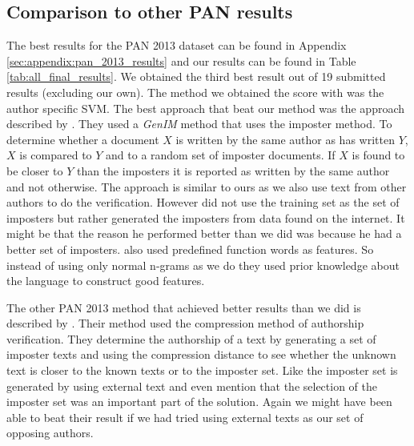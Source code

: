 \subsection{Comparison to other PAN results}
The best results for the PAN 2013 dataset can be found in Appendix
\ref{sec:appendix:pan_2013_results} and our results can be found in Table
\ref{tab:all_final_results}. We obtained the third best
result out of 19 submitted results (excluding our own). The method we obtained
the score with was the author specific SVM. The best approach that beat
our method was the approach described by \cite{seidman:2013}. They used a
\textit{GenIM} method that uses the imposter method. To determine whether a
document $X$ is written by the same author as has written $Y$, $X$ is compared
to $Y$ and to a random set of imposter documents. If $X$ is found to be closer
to $Y$ than the imposters it is reported as written by the same author and
not otherwise. The approach is similar to ours as we also use text from other
authors to do the verification. However \cite{seidman:2013} did not use the
training set as the set of imposters but rather generated the imposters from
data found on the internet. It might be that the reason he performed better than
we did was because he had a better set of imposters. \cite{seidman:2013} also
used predefined function words as features. So instead of using only normal
n-grams as we do they used prior knowledge about the language to construct good
features.

The other PAN 2013 method that achieved better results than we did is 
described by \cite{veenman:2013}. Their method used the compression method of
authorship verification. They determine the authorship of a text by generating
a set of imposter texts and using the compression distance to see whether
the unknown text is closer to the known texts or to the imposter set. Like
\cite{seidman:2013} the imposter set is generated by using external text and
\cite{veenman:2013} even mention that the selection of the imposter set was 
an important part of the solution. Again we might have been able to beat their
result if we had tried using external texts as our set of opposing authors.

